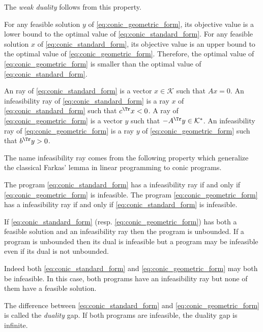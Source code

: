 \documentclass[11pt,twoside,a4paper,openright]{uclouvain-thesis}
\begin{document}
The \emph{weak duality} follows from this property.
\begin{mycoro}
  For any feasible solution $y$ of \eqref{eq:conic_geometric_form},
  its objective value is a lower bound to the optimal value of \eqref{eq:conic_standard_form}.
  For any feasible solution $x$ of \eqref{eq:conic_standard_form},
  its objective value is an upper bound to the optimal value of \eqref{eq:conic_geometric_form}.
  Therefore, the optimal value of \eqref{eq:conic_geometric_form} is smaller than
  the optimal value of \eqref{eq:conic_standard_form}.
\end{mycoro}

An ray of \eqref{eq:conic_standard_form} is a vector $x \in \mathcal{K}$
such that $Ax = 0$.
An infeasibility ray of \eqref{eq:conic_standard_form} is a ray $x$ of \eqref{eq:conic_standard_form} such that $c^\Tr x < 0$.
A ray of \eqref{eq:conic_geometric_form} is a vector $y$ such that
$-A^\Tr y \in \mathcal{K}^*$.
An infeasibility ray of \eqref{eq:conic_geometric_form} is a
ray $y$ of \eqref{eq:conic_geometric_form} such that $b^\Tr y > 0$.

The name infeasibility ray comes from the following property
which generalize the classical Farkas' lemma in linear programming to conic programs.

\begin{myprop}
  \label{prop:farkas}
  The program \eqref{eq:conic_standard_form} has a infeasibility ray
  if and only if \eqref{eq:conic_geometric_form} is infeasible.
  The program \eqref{eq:conic_geometric_form} has a infeasibility ray
  if and only if \eqref{eq:conic_standard_form} is infeasible.
\end{myprop}

If \eqref{eq:conic_standard_form} (resp. \eqref{eq:conic_geometric_form})
has both a feasible solution and an infeasibility ray then
the program is unbounded.
If a program is unbounded then its dual is infeasible but
a program may be infeasible even if its dual is not unbounded.

Indeed both \eqref{eq:conic_standard_form} and \eqref{eq:conic_geometric_form} may both be infeasible.
In this case, both programs have an infeasibility ray
but none of them have a feasible solution.

The difference between \eqref{eq:conic_standard_form} and \eqref{eq:conic_geometric_form}
is called the \emph{duality} gap.
If both programs are infeasible, the duality gap is infinite.
\end{document}
